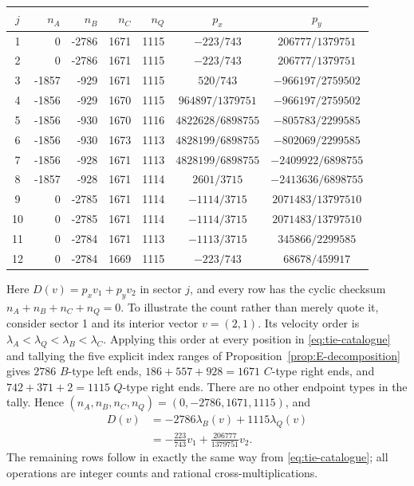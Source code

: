 \documentclass[11pt,reqno,letterpaper]{amsart}
\numberwithin{equation}{section}
\theoremstyle{definition}
\theoremstyle{remark}
\begin{document}
\begin{center}
\small
\begin{tabular}{c|rrrr|cc}
\toprule
\(j\)&\(n_A\)&\(n_B\)&\(n_C\)&\(n_Q\)&\(p_x\)&\(p_y\)\\
\midrule
1&0&-2786&1671&1115&\(-223/743\)&\(206777/1379751\)\\
2&0&-2786&1671&1115&\(-223/743\)&\(206777/1379751\)\\
3&-1857&-929&1671&1115&\(520/743\)&\(-966197/2759502\)\\
4&-1856&-929&1670&1115&\(964897/1379751\)&\(-966197/2759502\)\\
5&-1856&-930&1670&1116&\(4822628/6898755\)&\(-805783/2299585\)\\
6&-1856&-930&1673&1113&\(4828199/6898755\)&\(-802069/2299585\)\\
7&-1856&-928&1671&1113&\(4828199/6898755\)&\(-2409922/6898755\)\\
8&-1857&-928&1671&1114&\(2601/3715\)&\(-2413636/6898755\)\\
9&0&-2785&1671&1114&\(-1114/3715\)&\(2071483/13797510\)\\
10&0&-2785&1671&1114&\(-1114/3715\)&\(2071483/13797510\)\\
11&0&-2784&1671&1113&\(-1113/3715\)&\(345866/2299585\)\\
12&0&-2784&1669&1115&\(-223/743\)&\(68678/459917\)\\
\bottomrule
\end{tabular}
\end{center}
Here \(D(v)=p_xv_1+p_yv_2\) in sector \(j\), and every row has the
cyclic checksum \(n_A+n_B+n_C+n_Q=0\).  To illustrate the count rather
than merely quote it, consider sector 1 and its interior vector
\(v=(2,1)\).  Its velocity order is
\(\lambda_A<\lambda_Q<\lambda_B<\lambda_C\).  Applying this order at
every position in \eqref{eq:tie-catalogue} and tallying the five explicit
index ranges of Proposition~\ref{prop:E-decomposition} gives \(2786\)
\(B\)-type left ends, \(186+557+928=1671\) \(C\)-type right ends, and
\(742+371+2=1115\) \(Q\)-type right ends.  There are no other endpoint
types in the tally.  Hence
\((n_A,n_B,n_C,n_Q)=(0,-2786,1671,1115)\), and
\begin{equation}\label{eq:sample-sector-calculation}
 \begin{split}
 D(v)&=-2786\lambda_B(v)+1115\lambda_Q(v)\\
 &=-\frac{223}{743}v_1
   +\frac{206777}{1379751}v_2.
 \end{split}
\end{equation}
The remaining rows follow in exactly the same way from
\eqref{eq:tie-catalogue}; all operations are integer counts and rational
cross-multiplications.
\end{document}
